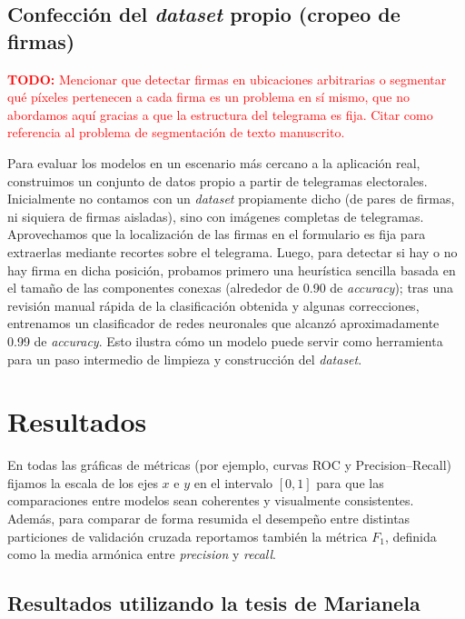 \subsection{Confección del \textit{dataset} propio (cropeo de firmas)}

\textcolor{red}{\textbf{TODO:} Mencionar que detectar firmas en ubicaciones arbitrarias o segmentar qué píxeles pertenecen a cada firma es un problema en sí mismo, que no abordamos aquí gracias a que la estructura del telegrama es fija. Citar \cite{handwritten-text-segmentation} como referencia al problema de segmentación de texto manuscrito.}

Para evaluar los modelos en un escenario más cercano a la aplicación real, construimos un conjunto de datos propio a partir de telegramas electorales. Inicialmente no contamos con un \textit{dataset} propiamente dicho (de pares de firmas, ni siquiera de firmas aisladas), sino con imágenes completas de telegramas. Aprovechamos que la localización de las firmas en el formulario es fija para extraerlas mediante recortes sobre el telegrama. Luego, para detectar si hay o no hay firma en dicha posición, probamos primero una heurística sencilla basada en el tamaño de las componentes conexas (alrededor de 0.90 de \textit{accuracy}); tras una revisión manual rápida de la clasificación obtenida y algunas correcciones, entrenamos un clasificador de redes neuronales que alcanzó aproximadamente 0.99 de \textit{accuracy}. Esto ilustra cómo un modelo puede servir como herramienta para un paso intermedio de limpieza y construcción del \textit{dataset}.

\section{Resultados}

En todas las gráficas de métricas (por ejemplo, curvas ROC y Precision--Recall) fijamos la escala de los ejes $x$ e $y$ en el intervalo $[0, 1]$ para que las comparaciones entre modelos sean coherentes y visualmente consistentes. Además, para comparar de forma resumida el desempeño entre distintas particiones de validación cruzada reportamos también la métrica $F_1$, definida como la media armónica entre \textit{precision} y \textit{recall}.

\subsection{Resultados utilizando la tesis de Marianela}

